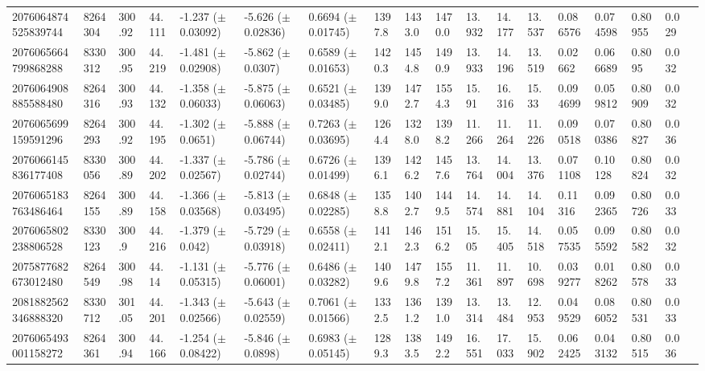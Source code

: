 \begin{sidewaystable}[htbp]
{\begin{tabular}{llllllllllllllllll}
        2076064874525839744 & 8264304 & 300.92 & 44.111 & -1.237 ($\pm$ 0.03092) & -5.626 ($\pm$ 0.02836) & 0.6694 ($\pm$ 0.01745) & 1397.8 & 1433.0 & 1470.0 & 13.932 & 14.177 & 13.537 & 0.086576 & 0.074598 & 0.80955 & 0.029 & \\
        2076065664799868288 & 8330312 & 300.95 & 44.219 & -1.481 ($\pm$ 0.02908) & -5.862 ($\pm$ 0.0307) & 0.6589 ($\pm$ 0.01653) & 1420.3 & 1454.8 & 1490.9 & 13.933 & 14.196 & 13.519 & 0.02662 & 0.066689 & 0.8095 & 0.032 & \\
        2076064908885588480 & 8264316 & 300.93 & 44.132 & -1.358 ($\pm$ 0.06033) & -5.875 ($\pm$ 0.06063) & 0.6521 ($\pm$ 0.03485) & 1399.0 & 1472.7 & 1554.3 & 15.91 & 16.316 & 15.33 & 0.094699 & 0.059812 & 0.80909 & 0.032 & \\
        2076065699159591296 & 8264293 & 300.92 & 44.195 & -1.302 ($\pm$ 0.0651) & -5.888 ($\pm$ 0.06744) & 0.7263 ($\pm$ 0.03695) & 1264.4 & 1328.0 & 1398.2 & 11.266 & 11.264 & 11.226 & 0.090518 & 0.070386 & 0.80827 & 0.036 & \\
        2076066145836177408 & 8330056 & 300.89 & 44.202 & -1.337 ($\pm$ 0.02567) & -5.786 ($\pm$ 0.02744) & 0.6726 ($\pm$ 0.01499) & 1396.1 & 1426.2 & 1457.6 & 13.764 & 14.004 & 13.376 & 0.071108 & 0.10128 & 0.80824 & 0.032 & \\
        2076065183763486464 & 8264155 & 300.89 & 44.158 & -1.366 ($\pm$ 0.03568) & -5.813 ($\pm$ 0.03495) & 0.6848 ($\pm$ 0.02285) & 1358.8 & 1402.7 & 1449.5 & 14.574 & 14.881 & 14.104 & 0.11316 & 0.092365 & 0.80726 & 0.033 & \\
        2076065802238806528 & 8330123 & 300.9 & 44.216 & -1.379 ($\pm$ 0.042) & -5.729 ($\pm$ 0.03918) & 0.6558 ($\pm$ 0.02411) & 1412.1 & 1462.3 & 1516.2 & 15.05 & 15.405 & 14.518 & 0.057535 & 0.095592 & 0.80582 & 0.032 & \\
        2075877682673012480 & 8264549 & 300.98 & 44.14 & -1.131 ($\pm$ 0.05315) & -5.776 ($\pm$ 0.06001) & 0.6486 ($\pm$ 0.03282) & 1409.6 & 1479.8 & 1557.2 & 11.361 & 11.897 & 10.698 & 0.039277 & 0.018262 & 0.80578 & 0.033 & \\
        2081882562346888320 & 8330712 & 301.05 & 44.201 & -1.343 ($\pm$ 0.02566) & -5.643 ($\pm$ 0.02559) & 0.7061 ($\pm$ 0.01566) & 1332.5 & 1361.2 & 1391.0 & 13.314 & 13.484 & 12.953 & 0.049529 & 0.086052 & 0.80531 & 0.033 & \\
        2076065493001158272 & 8264361 & 300.94 & 44.166 & -1.254 ($\pm$ 0.08422) & -5.846 ($\pm$ 0.0898) & 0.6983 ($\pm$ 0.05145) & 1289.3 & 1383.5 & 1492.2 & 16.551 & 17.033 & 15.902 & 0.062425 & 0.043132 & 0.80515 & 0.036 & \\

\end{tabular}}
\end{sidewaystable}
